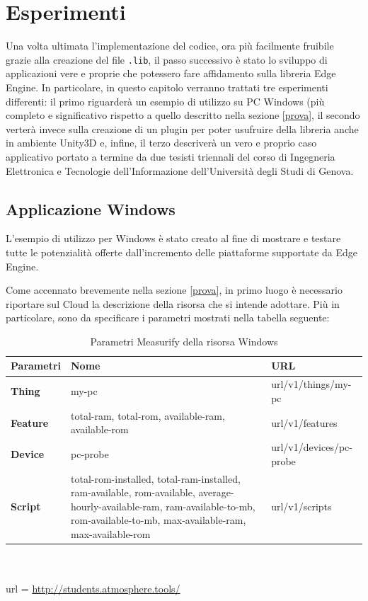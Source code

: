 \chapter{Esperimenti}
Una volta ultimata l’implementazione del codice, ora più facilmente fruibile grazie alla creazione del file \texttt{.lib}, il passo successivo è stato lo sviluppo di applicazioni vere e proprie che potessero fare affidamento sulla libreria Edge Engine. In particolare, in questo capitolo verranno trattati tre esperimenti differenti: il primo riguarderà un esempio di utilizzo su PC Windows (più completo e significativo rispetto a quello descritto nella sezione \ref{prova}, il secondo verterà invece sulla creazione di un plugin per poter usufruire della libreria anche in ambiente Unity3D e, infine, il terzo descriverà un vero e proprio caso applicativo portato a termine da due tesisti triennali del corso di Ingegneria Elettronica e Tecnologie dell'Informazione dell'Università degli Studi di Genova.
\section{Applicazione Windows}
L'esempio di utilizzo per Windows è stato creato al fine di mostrare e testare tutte le potenzialità offerte dall'incremento delle piattaforme supportate da Edge Engine.

Come accennato brevemente nella sezione \ref{prova}, in primo luogo è necessario riportare sul Cloud la descrizione della risorsa che si intende adottare. Più in particolare, sono da specificare i parametri mostrati nella tabella seguente:

\begin{table}[H]
	\begin{tabular}{|p{}|p{}|p{}|}
		\hline
		\textbf{Parametri} & \textbf{Nome} & \textbf{URL}\\
		\hline
		\textbf{Thing} & my-pc & {{url}}/v1/things/my-pc\\
		\hline
		\textbf{Feature} & total-ram, total-rom, available-ram, available-rom & {{url}}/v1/features\\
		\hline
		\textbf{Device} & pc-probe & {{url}}/v1/devices/pc-probe\\	
		\hline
		\textbf{Script} & total-rom-installed, total-ram-installed, ram-available, rom-available, average-hourly-available-ram, ram-available-to-mb, rom-available-to-mb,  max-available-ram, max-available-rom & {{url}}/v1/scripts\\	
		\hline
	\end{tabular}
\\\\url = \url{http://students.atmosphere.tools/}
	\caption{Parametri Measurify della risorsa Windows}
	\label{paramMeas}
\end{table}

